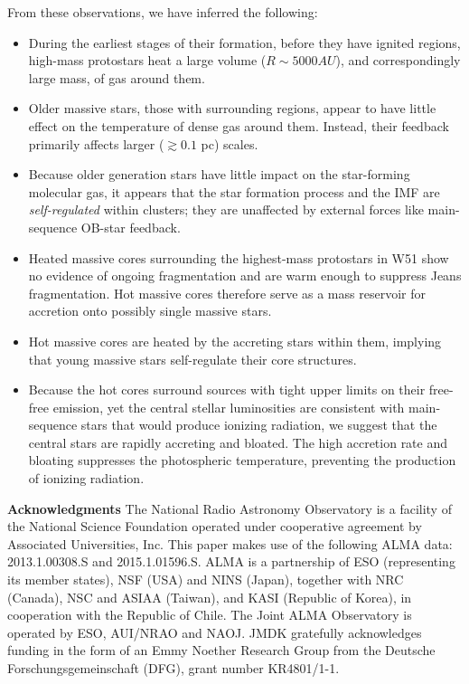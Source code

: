 \documentclass{emulateapj}
\begin{document}
From these observations, we have inferred the following: 
\begin{itemize}
    \item During the earliest stages of their formation, before they have 
        ignited \hii regions, high-mass protostars heat a large volume
        ($R\sim5000 AU$), and correspondingly large mass, of gas around them.
    \item Older massive stars, those with surrounding \hii regions, appear
        to have little effect on the temperature of dense gas around them.
        Instead, their feedback primarily affects larger ($\gtrsim 0.1$ pc)
        scales.
    \item Because older generation stars have little impact on the star-forming
        molecular gas, it appears that the star formation process and the IMF
        are \emph{self-regulated} within clusters; they are unaffected by
        external forces like main-sequence OB-star feedback.
    \item Heated massive cores surrounding the highest-mass protostars in
        W51 show no evidence of ongoing fragmentation and are warm enough
        to suppress Jeans fragmentation.  Hot massive cores therefore serve as
        a mass reservoir for accretion onto possibly single massive stars.
    \item Hot massive cores are heated by the accreting stars within them,
        implying that young massive stars self-regulate their  core
        structures.
    \item Because the hot cores surround sources with tight upper limits
        on their free-free emission, yet the central stellar luminosities
        are consistent with main-sequence stars that would produce ionizing
        radiation, we suggest that the central stars are rapidly accreting and
        bloated.  The high accretion rate and bloating suppresses the
        photospheric temperature, preventing the production of ionizing
        radiation.
\end{itemize}



\textbf{Acknowledgments}
The National Radio Astronomy Observatory is a facility of the National Science
Foundation operated under cooperative agreement by Associated Universities,
Inc.
This paper makes use of the following ALMA data: 2013.1.00308.S 
and 2015.1.01596.S.
ALMA is a partnership of ESO (representing its member states), NSF (USA) and
NINS (Japan), together with NRC (Canada), NSC and ASIAA (Taiwan), and KASI
(Republic of Korea), in cooperation with the Republic of Chile. The Joint ALMA
Observatory is operated by ESO, AUI/NRAO and NAOJ.
JMDK gratefully acknowledges funding in the form of an
Emmy Noether Research Group from the Deutsche Forschungsgemeinschaft (DFG),
grant number KR4801/1-1.
\end{document}
